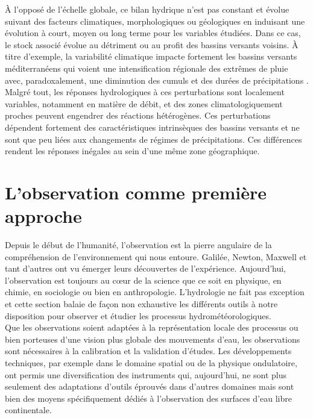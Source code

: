 À l'opposé de l'échelle globale, ce bilan hydrique n'est pas constant et évolue suivant des facteurs climatiques, morphologiques ou géologiques en induisant une évolution à court, moyen ou long terme pour les variables étudiées. Dans ce cas, le stock associé évolue au détriment ou au profit des bassins versants voisins. À titre d'exemple, la variabilité climatique impacte fortement les bassins versants méditerranéens qui voient une intensification régionale des extrêmes de pluie \citep{tramblay2013,ribes2019} avec, paradoxalement, une diminution des cumuls et des durées de précipitations \citep{folton2019}. Malgré tout, les réponses hydrologiques à ces perturbations sont localement variables, notamment en matière de débit, et des zones climatologiquement proches peuvent engendrer des réactions hétérogènes. Ces perturbations dépendent fortement des caractéristiques intrinsèques des bassins versants et ne sont que peu liées aux changements de régimes de précipitations. Ces différences rendent les réponses inégales au sein d'une même zone géographique.

\section{{\selectfont L'observation comme première approche}}
\label{sec:observations}

Depuis le début de l'humanité, l'observation est la pierre angulaire de la compréhension de l'environnement qui nous entoure. Galilée, Newton, Maxwell et tant d'autres ont vu émerger leurs découvertes de l'expérience. Aujourd'hui, l'observation est toujours au cœur de la science que ce soit en physique, en chimie, en sociologie ou bien en anthropologie. L'hydrologie ne fait pas exception et cette section balaie de façon non exhaustive les différents outils à notre disposition pour observer et étudier les processus hydrométéorologiques.\\ 
Que les observations soient adaptées à la représentation locale des processus ou bien porteuses d'une vision plus globale des mouvements d'eau, les observations sont nécessaires à la calibration et la validation d'études. Les développements techniques, par exemple dans le domaine spatial ou de la physique ondulatoire, ont permis une diversification des instruments qui, aujourd'hui, ne sont plus seulement des adaptations d'outils éprouvés dans d'autres domaines mais sont bien des moyens spécifiquement dédiés à l'observation des surfaces d'eau libre continentale.

